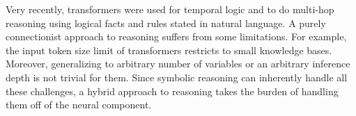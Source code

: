 Very recently, transformers were used for temporal logic \cite{finkbeiner2020teaching} and to do multi-hop reasoning \cite{clark2020transformers} using logical facts and rules stated in natural language. 
A purely connectionist approach to reasoning suffers from some limitations. For example, the input token size limit of transformers restricts \citet{clark2020transformers} to small knowledge bases. Moreover, generalizing to arbitrary number of variables or an arbitrary inference depth is not trivial for them. 
Since symbolic reasoning can inherently handle all these challenges, a hybrid approach to reasoning takes the burden of handling them off of the neural component. 


